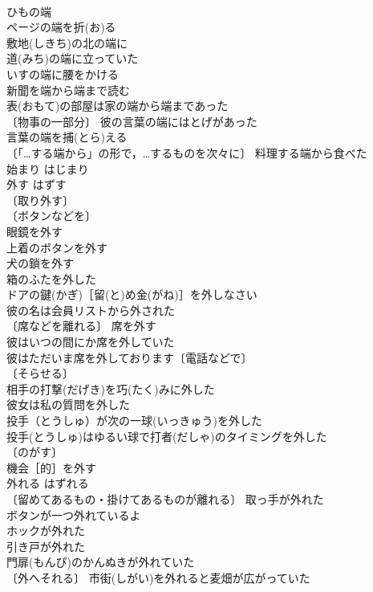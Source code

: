 \documentclass[8pt]{extreport}
\begin{document}
\begin{CJK}{UTF8}{min}
\\	ひもの端 
\\	ページの端を折(お)る 
\\	敷地(しきち)の北の端に 
\\	道(みち)の端に立っていた 
\\	いすの端に腰をかける 
\\	新聞を端から端まで読む 
\\	表(おもて)の部屋は家の端から端まであった 
\\	〔物事の一部分〕 彼の言葉の端にはとげがあった 
\\	言葉の端を捕(とら)える 
\\	〔「…する端から」の形で，…するものを次々に〕 料理する端から食べた 
\\	始まり	はじまり	
\\	外す	はずす	
\\	〔取り外す〕
\\	〔ボタンなどを〕
\\	眼鏡を外す 
\\	上着のボタンを外す 
\\	犬の鎖を外す 
\\	箱のふたを外した 
\\	ドアの鍵(かぎ)［留(と)め金(がね)］を外しなさい 
\\	彼の名は会員リストから外された 
\\	〔席などを離れる〕 席を外す 
\\	彼はいつの間にか席を外していた 
\\	彼はただいま席を外しております〔電話などで〕 
\\	〔そらせる〕
\\	相手の打撃(だげき)を巧(たく)みに外した 
\\	彼女は私の質問を外した 
\\	投手（とうしゅ）が次の一球(いっきゅう)を外した 
\\	投手(とうしゅ)はゆるい球で打者(だしゃ)のタイミングを外した 
\\	〔のがす〕　
\\	機会［的］を外す 
\\	外れる	はずれる	
\\	〔留めてあるもの・掛けてあるものが離れる〕 取っ手が外れた 
\\	ボタンが一つ外れているよ 
\\	ホックが外れた 
\\	引き戸が外れた 
\\	門扉(もんぴ)のかんぬきが外れていた 
\\	〔外へそれる〕 市街(しがい)を外れると麦畑が広がっていた 

\end{CJK}
\end{document}
